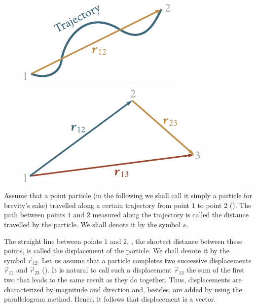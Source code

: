 \begin{figure}[t]
	\begin{minipage}[t]{0.5\linewidth}
		\begin{center}
			\includegraphics[scale=0.95]{figures/ch_01/fig_1_20.pdf}
			\caption[]{}
			\label{fig:1_20}
		\end{center}
	\end{minipage}
	\hfill{ }%
	\begin{minipage}[t]{0.5\linewidth}
		\begin{center}
			\includegraphics[scale=0.95]{figures/ch_01/fig_1_21.pdf}
			\caption[]{}
			\label{fig:1_21}
		\end{center}
	\end{minipage}
\end{figure}

Assume that a point particle (in the following we shall call it simply a particle for brevity's sake) travelled along a certain trajectory from point $1$ to point $2$ (). The path between points $1$ and $2$ measured along the trajectory is called the distance travelled by the particle. We shall denote it by the symbol $s$.

The straight line between points $1$ and $2$, \ie, the shortest distance between these points, is called the displacement of the particle. We shall denote it by the symbol $\vec{r}_{12}$. Let us assume that a particle completes two successive displacements $\vec{r}_{12}$ and $\vec{r}_{23}$ (). It is natural to call such a displacement $\vec{r}_{13}$ the sum of the first two that leads to the same result as they do together. Thus, displacements are characterized by magnitude and direction and, besides, are added by using the parallelogram method. Hence, it follows that displacement is a vector.

